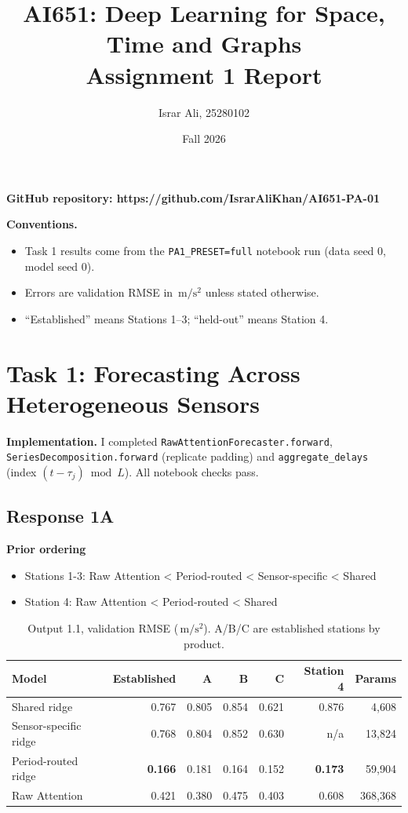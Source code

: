 \documentclass[11pt]{article}
\title{AI651: Deep Learning for Space, Time and Graphs\\Assignment 1 Report}
\author{Israr Ali, 25280102}
\date{Fall 2026}
\newcommand{\ms}{\,\mathrm{m/s^2}}
\begin{document}
\maketitle

\begin{center}
\textbf{GitHub repository: https://github.com/IsrarAliKhan/AI651-PA-01}
\end{center}

\textbf{Conventions.}
\begin{itemize}
  \item Task 1 results come from the \texttt{PA1\_PRESET=full} notebook run (data seed 0, model
  seed 0).
  \item Errors are validation RMSE in $\ms$ unless stated otherwise.
  \item ``Established'' means Stations 1--3; ``held-out'' means Station 4.
\end{itemize}

\section*{Task 1: Forecasting Across Heterogeneous Sensors}

\textbf{Implementation.} I completed \texttt{RawAttentionForecaster.forward},
\texttt{SeriesDecomposition.forward} (replicate padding) and \texttt{aggregate\_delays}
(index $(t-\tau_j)\bmod L$). All notebook checks pass.

\subsection*{Response 1A}

\textbf{Prior ordering}
\begin{itemize}
  \item Stations 1-3: Raw Attention < Period-routed < Sensor-specific < Shared
  \item Station 4: Raw Attention < Period-routed < Shared
\end{itemize}

\begin{table}[h]\centering\small
\begin{tabular}{lrrrrrr}
\toprule
Model & Established & A & B & C & Station 4 & Params\\
\midrule
Shared ridge & 0.767 & 0.805 & 0.854 & 0.621 & 0.876 & 4{,}608\\
Sensor-specific ridge & 0.768 & 0.804 & 0.852 & 0.630 & n/a & 13{,}824\\
Period-routed ridge & \textbf{0.166} & 0.181 & 0.164 & 0.152 & \textbf{0.173} & 59{,}904\\
Raw Attention & 0.421 & 0.380 & 0.475 & 0.403 & 0.608 & 368{,}368\\
\bottomrule
\end{tabular}
\caption{Output 1.1, validation RMSE ($\ms$). A/B/C are established stations by product.}
\end{table}
\end{document}
